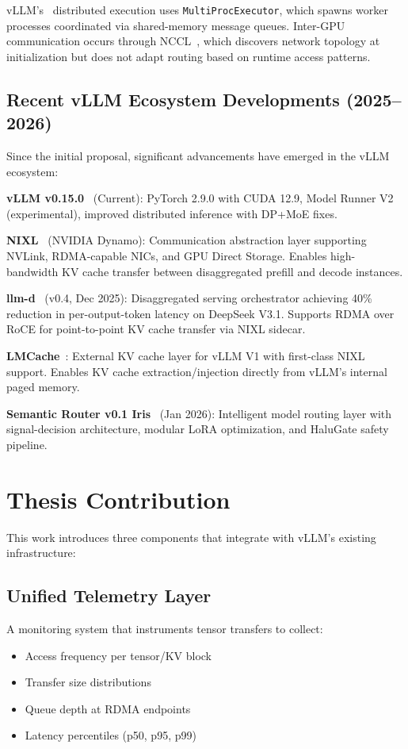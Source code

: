 \documentclass[10pt,letterpaper]{article}
\begin{document}
vLLM's~\cite{vllm} distributed execution uses \texttt{MultiProcExecutor}, which spawns worker processes coordinated via shared-memory message queues. Inter-GPU communication occurs through NCCL~\cite{nccl}, which discovers network topology at initialization but does not adapt routing based on runtime access patterns.

\subsection{Recent vLLM Ecosystem Developments (2025--2026)}

Since the initial proposal, significant advancements have emerged in the vLLM ecosystem:

\textbf{vLLM v0.15.0}~\cite{vllm} (Current): PyTorch 2.9.0 with CUDA 12.9, Model Runner V2 (experimental), improved distributed inference with DP+MoE fixes.

\textbf{NIXL}~\cite{nixl} (NVIDIA Dynamo): Communication abstraction layer supporting NVLink, RDMA-capable NICs, and GPU Direct Storage. Enables high-bandwidth KV cache transfer between disaggregated prefill and decode instances.

\textbf{llm-d}~\cite{llm-d} (v0.4, Dec 2025): Disaggregated serving orchestrator achieving 40\% reduction in per-output-token latency on DeepSeek V3.1. Supports RDMA over RoCE for point-to-point KV cache transfer via NIXL sidecar.

\textbf{LMCache}~\cite{lmcache}: External KV cache layer for vLLM V1 with first-class NIXL support. Enables KV cache extraction/injection directly from vLLM's internal paged memory.

\textbf{Semantic Router v0.1 Iris}~\cite{vllm-iris} (Jan 2026): Intelligent model routing layer with signal-decision architecture, modular LoRA optimization, and HaluGate safety pipeline.

\section{Thesis Contribution}

This work introduces three components that integrate with vLLM's existing infrastructure:

\subsection{Unified Telemetry Layer}
A monitoring system that instruments tensor transfers to collect:
\begin{itemize}[noitemsep]
    \item Access frequency per tensor/KV block
    \item Transfer size distributions
    \item Queue depth at RDMA endpoints
    \item Latency percentiles (p50, p95, p99)
\end{itemize}
\end{document}

